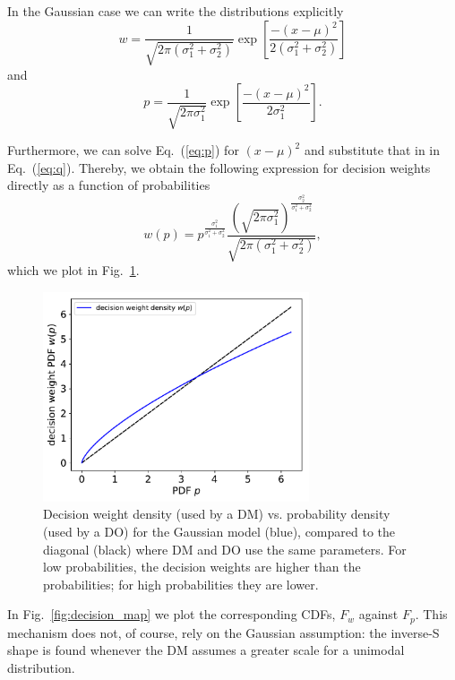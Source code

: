 \documentclass[11pt]{article}
\newcommand{\elabel}[1]{\label{eq:#1}}
\newcommand{\eref}[1]{Eq.~(\ref{eq:#1})}
\newcommand{\flabel}[1]{\label{fig:#1}}
\newcommand{\fref}[1]{Fig.~\ref{fig:#1}}
\newcommand{\be}{\begin{equation}}
\newcommand{\ee}{\end{equation}}
\numberwithin{equation}{section}
\begin{document}

In the Gaussian case we can write the distributions explicitly
\be
w=\frac{1}{\sqrt{2\pi (\sigma_1^2+\sigma_2^2)}}\exp\left[\frac{-(x -\mu )^2}{2 (\sigma_1^2+\sigma_2^2)}\right]
\elabel{q}
\ee
and
\be
p=\frac{1}{\sqrt{2\pi \sigma_1^2}}\exp\left[\frac{-(x -\mu )^2}{2 \sigma_1^2}\right].
\elabel{p}
\ee

Furthermore, we can solve \eref{p} for $(x -\mu )^2$ and substitute that in in \eref{q}. Thereby, we obtain the following expression for decision weights directly as a function of probabilities
\be
w(p)=p^{\frac{\sigma_1^2}{\sigma_1^2+\sigma_2^2}} \frac{\left(\sqrt{2\pi\sigma_1^2}\right)^{\frac{\sigma_2^2}{\sigma_1^2+\sigma_2^2}}}{\sqrt{2\pi(\sigma_1^2+\sigma_2^2)}},
\elabel{q_of_p}
\ee
which we plot in \fref{probability_weights}. 

\begin{figure}[!htb]
\centering
\includegraphics[width=0.7\textwidth]{./figs/decision_weights.pdf}
\caption{Decision weight density (used by a DM) vs. probability density (used by a DO) for the Gaussian model (blue), compared to the diagonal (black) where DM and DO use the same parameters. For low probabilities, the decision weights are higher than the probabilities; for high probabilities they are lower.}
\flabel{probability_weights}
\end{figure}

In \fref{decision_map} we plot the corresponding CDFs, $F_w$ against $F_p$. 
This mechanism does not, of course, rely on the Gaussian assumption: the inverse-S shape is found whenever the DM assumes a greater scale for a unimodal distribution.
\end{document}
